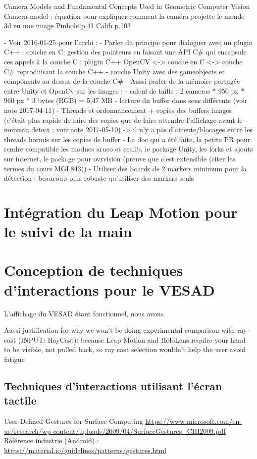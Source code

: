 Camera Models and Fundamental Concepts Used in Geometric Computer Vision
Camera model : équation pour expliquer comment la caméra projette le monde 3d en une image
Pinhole p.41
Calib p.103

- Voir 2016-01-25 pour l'archi :
  - Parler du principe pour dialoguer avec un plugin C++ : couche en C, gestion des pointeurs en faisant une API C\# qui encapsule ces appels à la couche C : plugin C++ OpenCV <-> couche en C <-> couche C\# reproduisant la couche C++ 
  - couche Unity avec des gameobjects et components au dessus de la couche C\#
- Aussi parler de la mémoire partagée entre Unity et OpenCv sur les images :
  - calcul de taille : 2 cameras * 950 px * 960 px * 3 bytes (RGB) = 5,47 MB
  - lecture du buffer dans sens différents (voir note 2017-04-11)
  - Threads et ordonnancement + copies des buffers images (c'était plus rapide de faire des copies que de faire attendre l'affichage avant le nouveau detect : voir note 2017-05-10) -> il n'y a pas d'attente/blocages entre les threads hormis sur les copies de buffer
- La doc qui a été faite, la petite PR pour rendre compatible les modues aruco et ccalib, le package Unity, les forks et ajouts sur internet, le package pour ovrvision (preuve que c'est extensible (citer les termes du cours MGL843))
- Utiliser des boards de 2 markers minimum pour la détection : beaucoup plus robuste qu'utiliser des markers seuls


\section{Intégration du Leap Motion pour le suivi de la main}


\section{Conception de techniques d'interactions pour le VESAD}
L'affichage du VESAD étant fonctionnel, nous avons 

Aussi justification for why we won’t be doing experimental comparison with ray cast (INPUT: RayCast): because Leap Motion and HoloLens require your hand to be visible, not pulled back, so ray cast selection wouldn’t help the user avoid fatigue

\subsection{Techniques d'interactions utilisant l'écran tactile}
User-Defined Gestures for Surface Computing \url{https://www.microsoft.com/en-us/research/wp-content/uploads/2009/04/SurfaceGestures_CHI2009.pdf}
Référence industrie (Android) : \url{https://material.io/guidelines/patterns/gestures.html}


